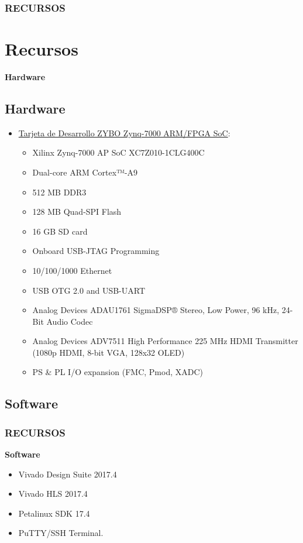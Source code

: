 \documentclass{beamer}
\begin{document}
\begin{frame}
\frametitle{RECURSOS}
\section{Recursos}
\textbf{Hardware}
\subsection{Hardware}
\begin{itemize}
\item \href{https://store.digilentinc.com/zybo-zynq-7000-arm-fpga-soc-trainer-board/}{Tarjeta de Desarrollo ZYBO Zynq-7000 ARM/FPGA SoC}:
  \begin{itemize}
  \item Xilinx Zynq-7000 AP SoC XC7Z010-1CLG400C
  \item Dual-core ARM Cortex™-A9 
  \item 512 MB DDR3 
  \item 128 MB Quad-SPI Flash 
  \item 16 GB SD card 
  \item Onboard USB-JTAG Programming
  \item 10/100/1000 Ethernet
  \item USB OTG 2.0 and USB-UART
  \item Analog Devices ADAU1761 SigmaDSP® Stereo, Low Power, 96 kHz, 24-Bit Audio Codec
  \item Analog Devices ADV7511 High Performance 225 MHz HDMI Transmitter (1080p HDMI, 8-bit VGA, 128x32 OLED)
  \item PS \& PL I/O expansion (FMC, Pmod, XADC) 
  \end{itemize}
\end{itemize}
\end{frame}
\begin{frame}
\subsection{Software}
\frametitle{RECURSOS}
    \textbf{Software}
    \begin{itemize}
    \item Vivado Design Suite 2017.4
    \item Vivado HLS 2017.4
    \item Petalinux SDK 17.4
    \item PuTTY/SSH Terminal.
    \end{itemize}
\end{frame}
\end{document}
